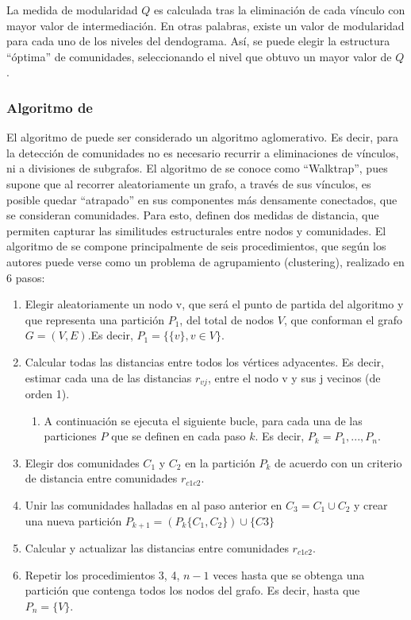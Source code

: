 \documentclass[12pt,letter]{article}
\begin{document}
\vspace{0.5cm}

La medida de modularidad $Q$ es calculada tras la eliminación de cada vínculo con mayor valor de intermediación. En otras palabras, existe un valor de modularidad para cada uno de los niveles del dendograma. Así, se puede elegir la estructura ``óptima'' de comunidades, seleccionando el nivel que obtuvo un mayor valor de $Q$.

\subsubsection{Algoritmo de \cite{Pons}}

El algoritmo de \cite{Pons} puede ser considerado un algoritmo aglomerativo. Es decir, para la detección de comunidades no es necesario recurrir a eliminaciones de vínculos, ni a divisiones de subgrafos. El algoritmo de \cite{Pons} se conoce como ``Walktrap'', pues supone que al recorrer aleatoriamente un grafo, a través de sus vínculos, es posible quedar ``atrapado'' en sus componentes más densamente conectados, que se consideran comunidades. Para esto, definen dos medidas de distancia, que permiten capturar las similitudes estructurales entre nodos y comunidades. El algoritmo de \cite{Pons} se compone principalmente de seis procedimientos, que según los autores puede verse como un problema de agrupamiento (clustering), realizado en 6 pasos:

\begin{enumerate}
\item Elegir aleatoriamente un nodo v, que será el punto de partida del algoritmo y que representa una partición $P_1$, del total de nodos $V$, que conforman el grafo $G=(V,E)$.Es decir, $P_1 =\{\{v\},v \in V\}.$
\item Calcular todas las distancias entre todos los vértices adyacentes. Es decir, estimar cada una de las distancias $r_{vj}$, entre el nodo v y sus j vecinos (de orden 1).
\begin{enumerate}
\item A continuación se ejecuta el siguiente bucle, para cada una de las particiones $P$ que se definen en cada paso $k$. Es decir, $P_k = P_1, ..., P_n$.
\end{enumerate}
\item Elegir dos comunidades $C_1$ y $C_2$ en la partición $P_k$ de acuerdo con un criterio de distancia entre comunidades $r_{c1c2}$.
\item Unir las comunidades halladas en al paso anterior en $C_3 = C_1 \cup C_2$ y crear una nueva partición $P_{k+1} =(P_k\{C_1,C_2\})\cup\{C3\}$
\item Calcular y actualizar las distancias entre comunidades $r_{c1c2}$.
\item Repetir los procedimientos 3, 4, $n - 1$ veces hasta que se obtenga una partición que contenga todos los nodos del grafo. Es decir, hasta que $P_n = \{V \}$.
\end{enumerate}
\end{document}

